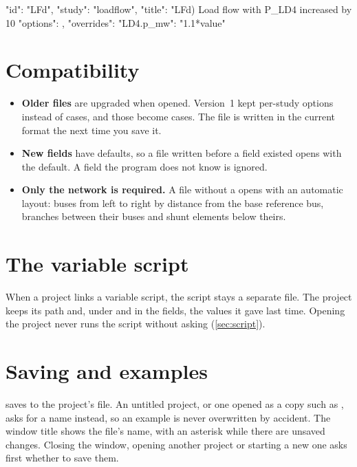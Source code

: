 \begin{terminal}
{"id": "LFd", "study": "loadflow",
 "title": "LFd) Load flow with P_LD4 increased by 10 %
 "options": {}, "overrides": {"LD4.p_mw": "1.1*value"}}
\end{terminal}

\section{Compatibility}

\begin{itemize}
  \item \textbf{Older files} are upgraded when opened. Version~1 kept per-study options
    instead of cases, and those become cases. The file is written in the current format
    the next time you save it.
  \item \textbf{New fields} have defaults, so a file written before a field existed opens
    with the default. A field the program does not know is ignored.
  \item \textbf{Only the network is required.} A file without a  opens with
    an automatic layout: buses from left to right by distance from the base reference
    bus, branches between their buses and shunt elements below theirs.
\end{itemize}

\section{The variable script}

When a project links a variable script, the script stays a separate  file. The
project keeps its path and, under  and in the fields, the values it
gave last time. Opening the project never runs the script without asking
(\cref{sec:script}).

\section{Saving and examples}

 saves to the project's file. An untitled project, or one opened as a
copy such as , asks for a name instead, so an example is never
overwritten by accident. The window title shows the file's name, with an asterisk while
there are unsaved changes. Closing the window, opening another project or starting a new
one asks first whether to save them.
